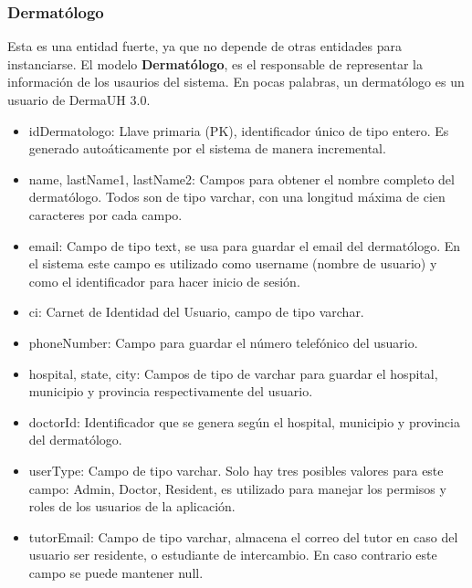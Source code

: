 \subsubsection{Dermat\'ologo}
Esta es una entidad fuerte, ya que no depende de otras entidades para instanciarse. El modelo
\textbf{Dermat\'ologo}, es el responsable de representar la informaci\'on de los usaurios del 
sistema. En pocas palabras, un dermat\'ologo es un usuario de DermaUH 3.0.
\begin{itemize}
    \item idDermatologo: Llave primaria (PK), identificador \'unico de tipo entero. Es generado auto\'aticamente por el sistema de manera incremental.
    \item name, lastName1, lastName2: Campos para obtener el nombre completo del dermat\'ologo. Todos son de tipo varchar, con una longitud m\'axima de cien caracteres por cada campo.
    \item email: Campo de tipo text, se usa para guardar el email del dermat\'ologo. En el sistema este campo es utilizado como username (nombre de usuario) y como el identificador para hacer inicio de sesi\'on.
    \item ci: Carnet de Identidad del Usuario, campo de tipo varchar.
    \item phoneNumber: Campo para guardar el n\'umero telef\'onico del usuario.
    \item hospital, state, city: Campos de tipo de varchar para guardar el hospital, municipio y provincia respectivamente del usuario.
    \item doctorId: Identificador que se genera seg\'un el hospital, municipio y provincia del dermat\'ologo.
    \item userType: Campo de tipo varchar. Solo hay tres posibles valores para este campo: Admin, Doctor, Resident, es utilizado para manejar los permisos y roles de los usuarios de la aplicaci\'on.
    \item tutorEmail: Campo de tipo varchar, almacena el correo del tutor en caso del usuario ser residente, o estudiante de intercambio. En caso contrario este campo se puede mantener null.
\end{itemize}

